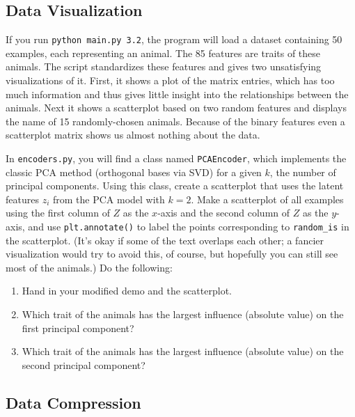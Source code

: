 \documentclass{article}
\newenvironment{asking}{\begingroup\color{blu}}{\endgroup}
\begin{document}
\pagebreak

\subsection{Data Visualization}

If you run \verb|python main.py 3.2|, the program will load a dataset containing 50 examples, each representing an animal.
The 85 features are traits of these animals.
The script standardizes these features and gives two unsatisfying visualizations of it.
First, it shows a plot of the matrix entries, which has too much information and thus gives little insight into the relationships between the animals.
Next it shows a scatterplot based on two random features and displays the name of 15 randomly-chosen animals.
Because of the binary features even a scatterplot matrix shows us almost nothing about the data.

In {\texttt{encoders.py}}, you will find {a class named \texttt{PCAEncoder}}, which implements the classic PCA method (orthogonal bases via SVD) for a given $k$, the number of principal components. Using this class, create a scatterplot that uses the latent features $z_i$ from the PCA model with $k=2$.
Make a scatterplot of all examples using the first column of $Z$ as the $x$-axis and the second column of $Z$ as the $y$-axis, and use \texttt{plt.annotate()} to label the points corresponding to \verb|random_is| in the scatterplot.
(It's okay if some of the text overlaps each other; a fancier visualization would try to avoid this, of course, but hopefully you can still see most of the animals.)
Do the following:
\begin{asking}
	\begin{enumerate}
		\item Hand in your modified demo and the scatterplot.
		\item Which trait of the animals has the largest influence (absolute value) on the first principal component?
		\item Which trait of the animals has the largest influence (absolute value) on the second principal component?
    \end{enumerate}
\end{asking}

\pagebreak

\subsection{Data Compression}
\end{document}
